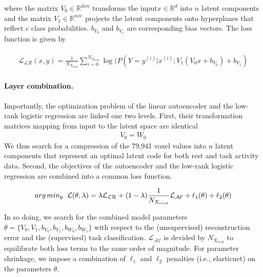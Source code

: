 \documentclass{article} %
\begin{document}
where the matrix $V_0 \in \mathbb{R}^{dxn}$ transforms the input$x \in \mathbb{R}^{d}$
into $n$ latent components
and the matrix $V_1 \in \mathbb{R}^{nxc}$ projects the latent components
onto hyperplanes that reflect $c$ class probabilities.
$b_{V_0}$ and $b_{V_1}$ are corresponding
bias vectors.
The loss function is given by

\begin{eqnarray}
  \begin{split}
    {\mathcal{L_{LR}}}(x, y) = \frac{1}{N_{X_{task}}} \sum_{i=0}^{N_{X_{task}}} \log(P(Y=y^{(i)}|x^{(i)}; V_1 (V_0 x + b_{V_0}) + b_{V_1})
\end{split}
\label{eq:lr_loss}
\end{eqnarray}

\paragraph{Layer combination.}
Importantly, the optimization problem of the linear autoencoder
and the low-rank logistic regression
are linked one two levels. First, their transformation matrices mapping from
input to the latent space are identical
\begin{eqnarray}
  V_0 = W_0
\end{eqnarray}
We thus search for a compression of the 79,941 voxel values into $n$ latent
components that represent an optimal latent code for both
rest and task activity data.
Second, the objectives of the autoencoder and the low-rank
logistic regression are combined into a common loss function.

\begin{eqnarray}
  \begin{split}
{arg\,min}_\theta \hspace{0.2cm} {\mathcal{L}}(\theta, \lambda) = \lambda {\mathcal{L_{LR}}}
+ (1-\lambda)\frac{1}{N_{X_{rest}}} {\mathcal{L_{AE}}} + \ell_1(\theta) + \ell_2(\theta)
  \label{eq:loss_equ}
\end{split}
\end{eqnarray}

In so doing, we search for the combined model parameters
$\theta=\{V_0,V_1,b_{V_0}, b_{V_1}, b_{W_0}, b_{W_1}\}$
with respect to the (unsupervised) reconstruction error and the
(supervised) task classification.
${\mathcal{L_{AE}}}$ is devided by ${N_{X_{rest}}}$ to equilibrate both
loss terms to the same order of magnitude.
For parameter shrinkage, we
impose a combination of $\ell_1$ and $\ell_2$ penalties (i.e., elasticnet)
on the parameters $\theta$.
\end{document}
